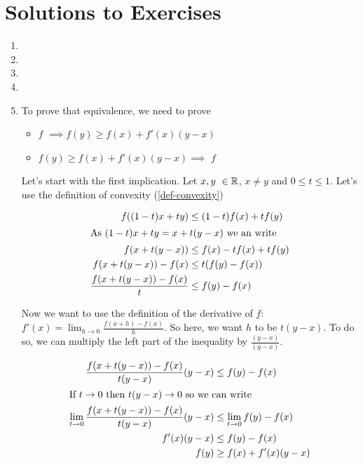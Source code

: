 \section{Solutions to Exercises}
\begin{enumerate}
\item 
\item 
\item 
\item 
\item To prove that equivalence, we need to prove 
    \begin{itemize}
        \item $f$ \cvx{} $\implies f(y) \geq f(x) + f'(x)(y-x)$ 
        \item $f(y) \geq f(x) + f'(x)(y-x) \implies$ $f$ \cvx 
    \end{itemize}
    Let's start with the first implication. Let $x,y \in \R$, $x\neq y$ and $0 \leq t \leq 1$. Let's use the definition of convexity (\ref{def-convexity})
    \begin{ceqn}
        \begin{align*}
            f((1-t)x + ty) &\leq (1-t)f(x) + tf(y) \\
            \intertext{As $(1-t)x + ty = x + t(y-x)$ we an write}
            f(x +t(y-x)) &\leq f(x) - tf(x) + tf(y) \\
            f(x +t(y-x)) - f(x) &\leq t(f(y) - f(x)) \\
            \frac{f(x +t(y-x)) - f(x)}{t} &\leq f(y) - f(x) \\
        \end{align*}
    \end{ceqn}
    Now we want to use the definition of the derivative of $f$: $f'(x) = \lim_{h\to 0} \frac{f(x + h) - f(x)}{h}$. So here, we want $h$ to be $t(y-x)$. To do so, we can multiply the left part of the inequality by $\frac{(y-x)}{(y-x)}$.
    \begin{ceqn}
        \begin{align*}
            \frac{f(x +t(y-x)) - f(x)}{t(y-x)} (y-x) &\leq f(y) - f(x) \\
             \intertext{If $t \to 0$ then $t(y-x) \to 0$ so we can write}
            \lim_{t\to 0} \frac{f(x +t(y-x)) - f(x)}{t(y-x)} (y-x) &\leq \lim_{t\to 0} f(y) - f(x) \\
            f'(x)(y-x) &\leq f(y) - f(x) \\
            f(y) &\geq f(x) + f'(x)(y-x) \\
        \end{align*}

\end{ceqn}
\end{enumerate}
